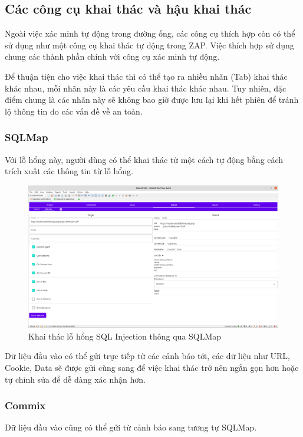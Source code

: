 \documentclass[./../main.tex]{subfiles}
\begin{document}
\subsection{Các công cụ khai thác và hậu khai thác}

Ngoài việc xác minh tự động trong đường ống, các công cụ thích hợp còn có thể sử dụng như một công cụ khai thác tự động trong ZAP. Việc thích hợp sử dụng chung các thành phần chính với công cụ xác minh tự động.

Để thuận tiện cho việc khai thác thì có thể tạo ra nhiều nhãn (Tab) khai thác khác nhau, mỗi nhãn này là các yêu cầu khai thác khác nhau. Tuy nhiên, đặc điểm chung là các nhãn này sẽ không bao giờ được lưu lại khi hết phiên để tránh lộ thông tin do các vấn đề về an toàn.
\subsubsection{SQLMap}
Với lỗ hổng này, người dùng có thể khai thác từ một cách tự động bằng cách trích xuất các thông tin từ lỗ hổng.

\begin{figure}[h!]
	\includegraphics[width=\linewidth]{./images/sqlmap_explot.png}
	\caption{Khai thác lỗ hổng SQL Injection thông qua SQLMap}
	\label{fig:sqlmap_explot}
\end{figure}
Dữ liệu đầu vào có thể gửi trực tiếp từ các cảnh báo tới, các dữ liệu như URL, Cookie, Data sẽ được gửi cùng sang để việc khai thác trở nên ngắn gọn hơn hoặc tự chỉnh sửa để dễ dàng xác nhận hơn.
\subsubsection{Commix}

Dữ liệu đầu vào cũng có thể gửi từ cảnh báo sang tương tự SQLMap.
\end{document}
